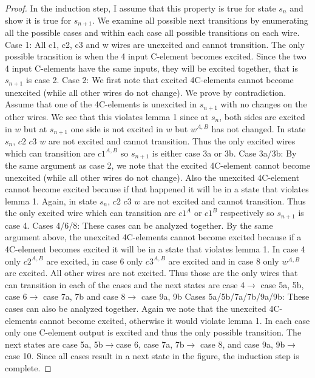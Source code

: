 \documentclass{article}
\begin{document}
\begin{proof}
In the induction step, I assume that this property is true for state $s_n$ and show it is true for $s_{n+1}$.  \newline
We examine all possible next transitions by enumerating all the possible cases and within each case all possible transitions on each wire. \newline
Case 1:  All c1, c2, c3 and w wires are unexcited and cannot transition.  The only possible transition is when the 4 input C-element becomes excited.  Since the two 4 input C-elements have the same inputs, they will be excited together, that is $s_{n+1}$ is case 2.\newline
Case 2:  We first note that excited 4C-elements cannot become unexcited (while all other wires do not change).  We prove by contradiction.  Assume that one of the 4C-elements is unexcited in $s_{n+1}$ with no changes on the other wires.  We see that this violates lemma 1 since at $s_n$, both sides are excited in $w$ but at $s_{n+1}$ one side is not excited in $w$ but $w^{A,B}$ has not changed.  In state $s_n$, $c2$ $c3$ $w$ are not excited and cannot transition.  Thus the only excited wires which can transition are $c1^{A,B}$ so $s_{n+1}$ is either case 3a or 3b. \newline
Case 3a/3b:  By the same argument as case 2, we note that the excited 4C-element cannot become unexcited (while all other wires do not change).  Also the unexcited 4C-element cannot become excited because if that happened it will be in a state that violates lemma 1.  Again, in state $s_n$, $c2$ $c3$ $w$ are not excited and cannot transition.  Thus the only excited wire which can transition are $c1^{A}$ or $c1^{B}$ respectively so $s_{n+1}$ is case 4. \newline
Cases 4/6/8:  These cases can be analyzed together.  By the same argument above, the unexcited 4C-elements cannot become excited because if a 4C-element becomes excited it will be in a state that violates lemma 1.  In case 4 only $c2^{A,B}$ are excited, in case 6 only $c3^{A,B}$ are excited and in case 8 only $w^{A,B}$ are excited.  All other wires are not excited.  Thus those are the only wires that can transition in each of the cases and the next states are case 4$\rightarrow$ case 5a, 5b, case 6$\rightarrow$ case 7a, 7b and case 8$\rightarrow$ case 9a, 9b
\newline
Cases 5a/5b/7a/7b/9a/9b:  These cases can also be analyzed together.  Again we note that the unexcited 4C-elements cannot become excited, otherwise it would violate lemma 1.  In each case only one C-element output is excited and thus the only possible transition.  The next states are case 5a, 5b$\rightarrow$case 6, case 7a, 7b$\rightarrow$ case 8, and case 9a, 9b$\rightarrow$ case 10.
\newline
Since all cases result in a next state in the figure, the induction step is complete.\newline


\end{proof}
\end{document}
